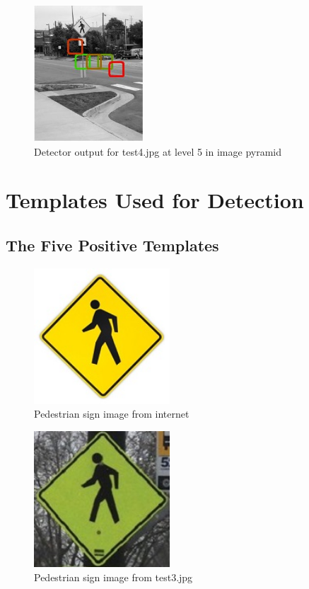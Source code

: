 \documentclass[11pt,psfig]{article}
\begin{document}
\begin{figure}[H]
\centering
\includegraphics[height=2in]{prob5b_plot2_level5.jpg}
\caption{Detector output for test4.jpg at level 5 in image pyramid}
\end{figure}

\section*{Templates Used for Detection}

\subsection*{The Five Positive Templates}

\begin{figure}[H]
\centering
\includegraphics[height=2in]{prob4posTrain/pedSign2Train.jpg}
\caption{Pedestrian sign image from internet}
\end{figure}

\begin{figure}[H]
\centering
\includegraphics[height=2in]{prob4posTrain/test3train.jpg}
\caption{Pedestrian sign image from test3.jpg}
\end{figure}
\end{document}
